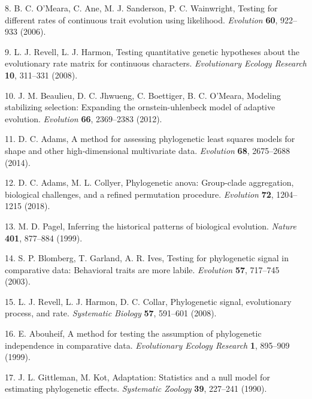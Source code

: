 \documentclass[
]{article}
\begin{document}
\leavevmode\hypertarget{ref-OMeara_et_al2006}{}%
8. B. C. O'Meara, C. Ane, M. J. Sanderson, P. C. Wainwright, Testing for
different rates of continuous trait evolution using likelihood.
\emph{Evolution} \textbf{60}, 922--933 (2006).

\leavevmode\hypertarget{ref-RevellHarmon2008}{}%
9. L. J. Revell, L. J. Harmon, Testing quantitative genetic hypotheses
about the evolutionary rate matrix for continuous characters.
\emph{Evolutionary Ecology Research} \textbf{10}, 311--331 (2008).

\leavevmode\hypertarget{ref-Beaulieu_et_al2012}{}%
10. J. M. Beaulieu, D. C. Jhwueng, C. Boettiger, B. C. O'Meara, Modeling
stabilizing selection: Expanding the ornstein-uhlenbeck model of
adaptive evolution. \emph{Evolution} \textbf{66}, 2369--2383 (2012).

\leavevmode\hypertarget{ref-Adams2014b}{}%
11. D. C. Adams, A method for assessing phylogenetic least squares
models for shape and other high-dimensional multivariate data.
\emph{Evolution} \textbf{68}, 2675--2688 (2014).

\leavevmode\hypertarget{ref-AdamsCollyer2018b}{}%
12. D. C. Adams, M. L. Collyer, Phylogenetic anova: Group-clade
aggregation, biological challenges, and a refined permutation procedure.
\emph{Evolution} \textbf{72}, 1204--1215 (2018).

\leavevmode\hypertarget{ref-Pagel1999}{}%
13. M. D. Pagel, Inferring the historical patterns of biological
evolution. \emph{Nature} \textbf{401}, 877--884 (1999).

\leavevmode\hypertarget{ref-Blomberg_et_al2003}{}%
14. S. P. Blomberg, T. Garland, A. R. Ives, Testing for phylogenetic
signal in comparative data: Behavioral traits are more labile.
\emph{Evolution} \textbf{57}, 717--745 (2003).

\leavevmode\hypertarget{ref-Revell_et_al2008}{}%
15. L. J. Revell, L. J. Harmon, D. C. Collar, Phylogenetic signal,
evolutionary process, and rate. \emph{Systematic Biology} \textbf{57},
591--601 (2008).

\leavevmode\hypertarget{ref-Abouheif1999}{}%
16. E. Abouheif, A method for testing the assumption of phylogenetic
independence in comparative data. \emph{Evolutionary Ecology Research}
\textbf{1}, 895--909 (1999).

\leavevmode\hypertarget{ref-Gittleman1990}{}%
17. J. L. Gittleman, M. Kot, Adaptation: Statistics and a null model for
estimating phylogenetic effects. \emph{Systematic Zoology} \textbf{39},
227--241 (1990).
\end{document}
